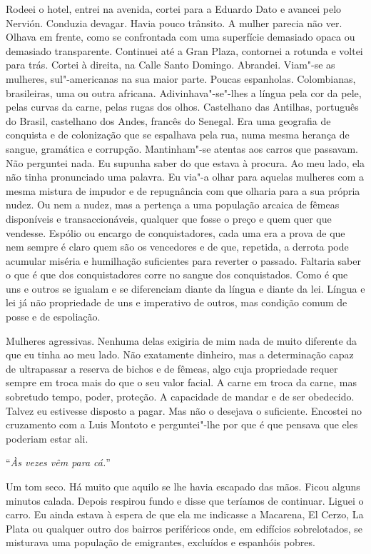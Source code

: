 Rodeei o hotel, entrei na avenida, cortei para a Eduardo Dato e avancei
pelo Nervión. Conduzia devagar. Havia pouco trânsito.
A mulher parecia não ver. Olhava em frente, como se confrontada com uma
superfície demasiado opaca ou demasiado transparente. Continuei até a
Gran Plaza, contornei a rotunda e voltei para trás. Cortei à direita, na
Calle Santo Domingo. Abrandei. Viam"-se as mulheres, sul"-americanas na
sua maior parte. Poucas espanholas. Colombianas, brasileiras, uma ou
outra africana. Adivinhava"-se"-lhes a língua pela cor da pele, pelas
curvas da carne, pelas rugas dos olhos. Castelhano das Antilhas,
português do Brasil, castelhano dos Andes, francês do Senegal. Era uma
geografia de conquista e de colonização que se espalhava pela rua, numa
mesma herança de sangue, gramática e corrupção. Mantinham"-se atentas
aos carros que passavam. Não perguntei nada. Eu supunha saber do que
estava à procura. Ao meu lado, ela não tinha pronunciado uma palavra. Eu
via"-a olhar para aquelas mulheres com a mesma mistura de impudor e de
repugnância com que olharia para a sua própria nudez. Ou nem a nudez,
mas a pertença a uma população arcaica de fêmeas disponíveis e
transaccionáveis, qualquer que fosse o preço e quem quer que vendesse.
Espólio ou encargo de conquistadores, cada uma era a prova de que nem
sempre é claro quem são os vencedores e de que, repetida, a derrota pode
acumular miséria e humilhação suficientes para reverter o passado.
Faltaria saber o que é que dos conquistadores corre no sangue dos
conquistados. Como é que uns e outros se igualam e se diferenciam diante
da língua e diante da lei. Língua e lei já não propriedade de uns e
imperativo de outros, mas condição comum de posse e de espoliação.

Mulheres agressivas. Nenhuma delas exigiria de mim nada de muito
diferente da que eu tinha ao meu lado. Não exatamente dinheiro, mas a
determinação capaz de ultrapassar a reserva de bichos e de fêmeas, algo
cuja propriedade requer sempre em troca mais do que o seu valor facial.
A carne em troca da carne, mas sobretudo tempo, poder, proteção. A
capacidade de mandar e de ser obedecido. Talvez eu estivesse disposto a
pagar. Mas não o desejava o suficiente. Encostei no cruzamento com a
Luis Montoto e perguntei"-lhe por que é que pensava que eles poderiam
estar ali.

``\emph{Às vezes vêm para cá.}''

Um tom seco. Há muito que aquilo se lhe havia escapado das mãos. Ficou
alguns minutos calada. Depois respirou fundo e disse que teríamos de
continuar. Liguei o carro. Eu ainda estava à espera de que ela me
indicasse a Macarena, El Cerzo, La Plata ou qualquer outro dos bairros
periféricos onde, em edifícios sobrelotados, se misturava uma população
de emigrantes, excluídos e espanhóis pobres.


